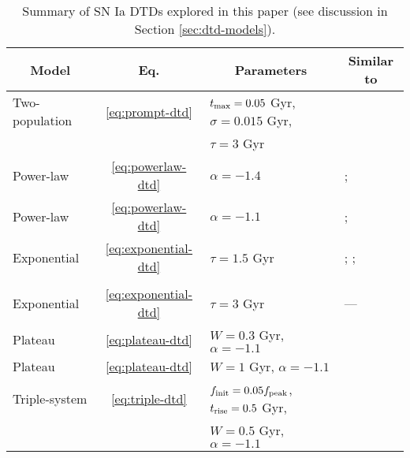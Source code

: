 \documentclass[twocolumn,twocolappendix,linenumbers]{aastex631}
\begin{document}
\begin{table*}
    \centering
    \caption{Summary of SN Ia DTDs explored in this paper (see discussion in Section \ref{sec:dtd-models}).}
    \label{tab:dtds}
    \begin{tabular}{lcll}
        \hline\hline
        \multicolumn{1}{c}{Model} & Eq. & \multicolumn{1}{c}{Parameters} & \multicolumn{1}{c}{Similar to} \\
        \hline
        Two-population  & \ref{eq:prompt-dtd}   & $t_{\rm max}=0.05$ Gyr, $\sigma=0.015$ Gyr, & \citet{Mannucci2006-TwoPopulations} \\
                        &                       & $\tau=3$ Gyr & \\
        Power-law   & \ref{eq:powerlaw-dtd} & $\alpha=-1.4$                 & \citet[][cluster]{Maoz2017-CosmicDTD}; 
                                                      \citet{Heringer2019-FieldGalaxyDTD}       \\
        Power-law   & \ref{eq:powerlaw-dtd} & $\alpha=-1.1$                 & \citet[][field]{Maoz2017-CosmicDTD}; 
                                                      \citet{Wiseman2021-DESRates}              \\
        Exponential & \ref{eq:exponential-dtd}  & $\tau=1.5$ Gyr    & \citet[][SD]{Greggio2005-AnalyticalRates};
                                                                      \citet{Schonrich2009-RadialMixing};       \\
                    &                           &                   & \citet{Weinberg2017-ChemicalEquilibrium}  \\
        Exponential & \ref{eq:exponential-dtd}  & $\tau=3$ Gyr   & --- \\
        Plateau     & \ref{eq:plateau-dtd}  & $W=0.3$ Gyr, $\alpha=-1.1$    & \citet[][CLOSE DD]{Greggio2005-AnalyticalRates} \\
        Plateau     & \ref{eq:plateau-dtd}  & $W=1$ Gyr, $\alpha=-1.1$      & \citet[][WIDE DD]{Greggio2005-AnalyticalRates} \\
        Triple-system   & \ref{eq:triple-dtd}   & $f_{\rm init}=0.05f_{\rm peak}$, $t_{\rm rise}=0.5$ Gyr, & \citet{Rajamuthukumar2023-TripleEvolution} \\
                        &                       & $W=0.5$ Gyr, $\alpha=-1.1$ & \\
        \hline
    \end{tabular}
\end{table*}
\end{document}
